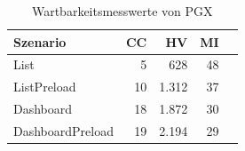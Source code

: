 \begin{table}[ht]
\centering
\caption{Wartbarkeitsmesswerte von PGX}
\begin{tabular}{lrrrr}
\toprule
Szenario & CC & HV & MI \\
\midrule
	List & 5 & 628 & 48 \\
	ListPreload & 10 & 1.312 & 37 \\
	Dashboard & 18 & 1.872 & 30 \\
	DashboardPreload & 19 & 2.194 & 29 \\
\bottomrule
\end{tabular}
\label{tab:wartbarkeit_pgx}
\end{table}
	